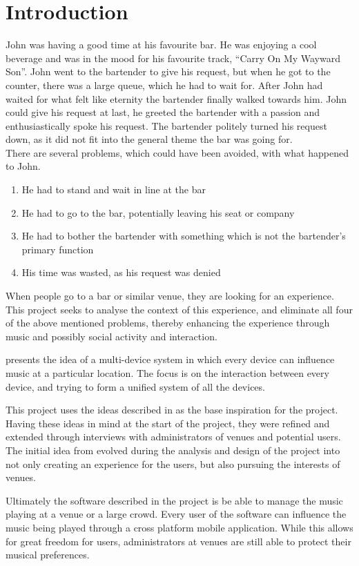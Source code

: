 \chapter{Introduction}\label{introduction} John was having a good time
at his favourite bar. He was enjoying a cool beverage and was in the
mood for his favourite track, \enquote{Carry On My Wayward Son}. John
went to the bartender to give his request, but when he got to the
counter, there was a large queue, which he had to wait for. After John
had waited for what felt like eternity the bartender finally walked
towards him. John could give his request at last, he greeted the
bartender with a passion and enthusiastically spoke his request. The
bartender politely turned his request down, as it did not fit into the
general theme the bar was going for.\\

There are several problems, which could have been avoided, with what
happened to John.
\begin{enumerate}
	\item He had to stand and wait in line at the bar
	\item He had to go to the bar, potentially leaving his seat or
company
	\item He had to bother the bartender with something which is
not the bartender's primary function
	\item His time was wasted, as his request was denied
\end{enumerate}

When people go to a bar or similar venue, they are looking for an
experience. This project seeks to analyse the context of this
experience, and eliminate all four of the above mentioned problems,
thereby enhancing the experience through music and possibly social
activity and interaction.

\cite{sorensen2012} presents the idea of a multi-device system in
which every device can influence music at a particular location. The
focus is on the interaction between every device, and trying to form a
unified system of all the devices.

This project uses the ideas described in \cite{sorensen2012} as the
base inspiration for the project. Having these ideas in mind at the start of the
project, they were refined and extended through interviews with
administrators of venues and potential users. The initial idea from
\cite{sorensen2012} evolved during the analysis and design of the
project into not only creating an experience for the users, but also
pursuing the interests of venues.

Ultimately the software described in the project is be able to manage
the music playing at a venue or a large crowd. Every user of the
software can influence the music being played through a cross platform
mobile application. While this allows for great freedom for users,
administrators at venues are still able to protect their musical
preferences.
